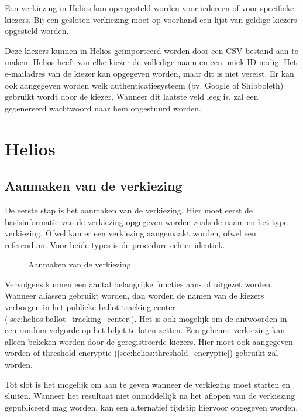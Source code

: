 Een verkiezing in Helios kan opengesteld worden voor iedereen of voor specifieke kiezers. Bij een gesloten verkiezing moet op voorhand een lijst van geldige kiezers opgesteld worden.

\npar Deze kiezers kunnen in Helios ge\"importeerd worden door een CSV-bestand aan te maken. Helios heeft van elke kiezer de volledige naam en een uniek ID nodig. Het e-mailadres van de kiezer kan opgegeven worden, maar dit is niet vereist. Er kan ook aangegeven worden welk authenticatiesysteem (bv. Google of Shibboleth) gebruikt wordt door de kiezer. Wanneer dit laatste veld leeg is, zal een gegenereerd wachtwoord naar hem opgestuurd worden.

\section{Helios}
\label{sec:proc:helios}

\subsection{Aanmaken van de verkiezing}

De eerste stap is het aanmaken van de verkiezing. Hier moet eerst de basisinformatie van de verkiezing opgegeven worden zoals de naam en het type verkiezing. Ofwel kan er een verkiezing aangemaakt worden, ofwel een referendum. Voor beide types is de procedure echter identiek.

\begin{figure}
  \caption{Aanmaken van de verkiezing}
  \label{fig:proc:elections_new}
\end{figure}

\npar Vervolgens kunnen een aantal belangrijke functies aan- of uitgezet worden. Wanneer aliassen gebruikt worden, dan worden de namen van de kiezers verborgen in het publieke ballot tracking center (\ref{sec:helios:ballot_tracking_center}). Het is ook mogelijk om de antwoorden in een random volgorde op het biljet te laten zetten. Een geheime verkiezing kan alleen bekeken worden door de geregistreerde kiezers. Hier moet ook aangegeven worden of threshold encryptie  (\ref{sec:helios:threshold_encryptie}) gebruikt zal worden.

\npar Tot slot is het mogelijk om aan te geven wanneer de verkiezing moet starten en sluiten. Wanneer het resultaat niet onmiddellijk na het aflopen van de verkiezing gepubliceerd mag worden, kan een alternatief tijdstip hiervoor opgegeven worden.

